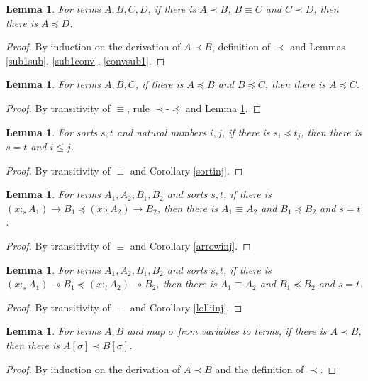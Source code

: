 \documentclass{article}
\newtheorem{lemma}[theorem]{Lemma}
\theoremstyle{definition}
\newcommand{\rname}[1]{\textsc{\footnotesize #1}}
\newcommand{\stype}[1]{:_{#1}}
\begin{document}
\begin{lemma}\label{sub1trans}
  For terms $A, B, C, D$, if there is $A \prec B$, $B \equiv C$ and $C \prec D$, then there is $A \preceq D$.
\end{lemma}
\begin{proof}
  By induction on the derivation of $A \prec B$, definition of $\prec$ and Lemmas \ref{sub1sub}, \ref{sub1conv}, \ref{convsub1}.
\end{proof}

\begin{lemma}
  For terms $A, B, C$, if there is $A \preceq B$ and $B \preceq C$, then there is $A \preceq C$.
\end{lemma}
\begin{proof}
  By transitivity of $\equiv$, rule \rname{$\prec$-$\preceq$} and Lemma \ref{sub1trans}.
\end{proof}

\begin{lemma}
  For sorts $s, t$ and natural numbers $i, j$, if there is $s_i \preceq t_j$, then there is $s = t$ and $i \leq j$.
\end{lemma}
\begin{proof}
  By transitivity of $\equiv$ and Corollary \ref{sortinj}.
\end{proof}

\begin{lemma}
  For terms $A_1, A_2, B_1, B_2$ and sorts $s, t$, if there is $(x \stype{s} A_1) \rightarrow B_1 \preceq (x \stype{t} A_2) \rightarrow B_2$, then there is $A_1 \equiv A_2$ and $B_1 \preceq B_2$ and $s = t$.
\end{lemma}
\begin{proof}
  By transitivity of $\equiv$ and Corollary \ref{arrowinj}.
\end{proof}

\begin{lemma}
  For terms $A_1, A_2, B_1, B_2$ and sorts $s, t$, if there is $(x \stype{s} A_1) \multimap B_1 \preceq (x \stype{t} A_2) \multimap B_2$, then there is $A_1 \equiv A_2$ and $B_1 \preceq B_2$ and $s = t$.
\end{lemma}
\begin{proof}
  By transitivity of $\equiv$ and Corollary \ref{lolliinj}.
\end{proof}

\begin{lemma}\label{sub1subst}
  For terms $A, B$  and map $\sigma$ from variables to terms, if there is $A \prec B$, then there is $A[\sigma] \prec B[\sigma]$.
\end{lemma}
\begin{proof}
  By induction on the derivation of $A \prec B$ and the definition of $\prec$.
\end{proof}
\end{document}
